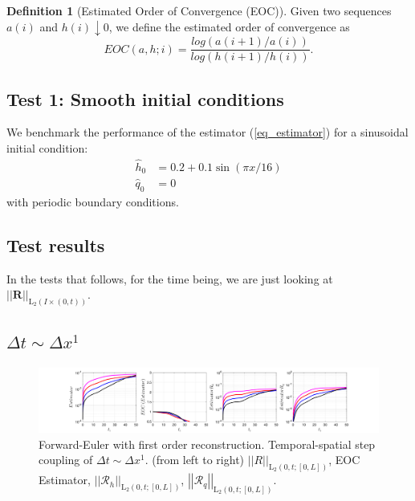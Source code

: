\documentclass[12pt,a4paper]{article}
\numberwithin{equation}{section}
\theoremstyle{definition}
\newcommand{\Norm}[1]{\left|\left|#1\right|\right|}
\newcommand{\vect}[1]{\textbf{#1}}
\newcommand{\leb}{\text{L}}
\newcommand{\qp}[1]{\left(#1\right)}
\newcommand{\qb}[1]{\left[#1\right]}
\newcommand{\Normgs}[1]{\left|\left|#1\right|\right|}
\newtheorem{Defn}[subsection]{Definition}
\begin{document}
\begin{Defn}[Estimated Order of Convergence (EOC)] Given two sequences $a\qp{i}$ and $h\qp{i}\downarrow 0$, we define the estimated order of convergence as
\begin{equation}
EOC\qp{a,h;i} = \frac{log\qp{a\qp{i+1}/a\qp{i}}}{log\qp{h\qp{i+1}/h\qp{i}}}.
\end{equation}
\end{Defn}

\subsection{Test 1: Smooth initial conditions}  We benchmark the performance of the estimator (\ref{eq_estimator}) for a sinusoidal initial condition:
\begin{equation}
\begin{aligned}
\widehat{h}_0&=	0.2+0.1\sin\qp{\pi x /16}\\
\widehat{q}_0&=0
\end{aligned}
\end{equation}
with periodic boundary conditions. 
\subsection{Test results}\label{sec:num_exp}
In the tests that follows, for the time being, we are just looking at $\Norm{\vect{R}}_{\leb_2\qp{I\times\qp{0,t}}}$.
\subsection*{$\Delta t \sim \Delta x^1$}
\begin{figure}[H]
	\hspace{-3cm}
	\includegraphics[scale=0.55]{../figures/fig_SHW_RK1_LXF_rec1_pow_oneplots_1x5_shw_periodic}	
	\caption{Forward-Euler with first order reconstruction.  Temporal-spatial step coupling of $\Delta t\sim \Delta x^1$. (from left to right) $\Normgs{R}_{\leb_2\qp{0,t; \qb{0,L}}}$, EOC Estimator, $\Normgs{\mathcal{R}_h}_{\leb_2\qp{0,t; \qb{0,L}}}$, $\Normgs{\mathcal{R}_q}_{\leb_2\qp{0,t; \qb{0,L}}}$.}
	\label{fig_all_RK1_LXF_rec1_pow_one}
\end{figure}
\end{document}
